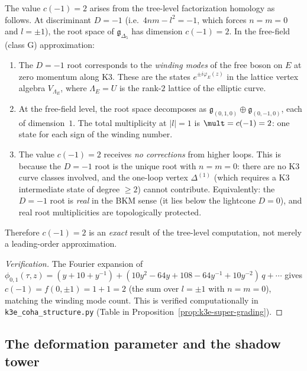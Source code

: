 \begin{conjecture}[Perturbative derivation of $c(-1) = 2$]
\label{conj:k3-c-minus-1}
\ClaimStatusConjectured
The value $c(-1) = 2$ arises from the tree-level factorization
homology as follows. At discriminant $D = -1$ (i.e.\
$4nm - l^2 = -1$, which forces $n = m = 0$ and $l = \pm 1$),
the root space of $\mathfrak{g}_{\Delta_5}$ has dimension
$c(-1) = 2$. In the free-field (class G) approximation:
\begin{enumerate}[label=(\roman*)]
\item The $D = -1$ root corresponds to the \emph{winding modes}
 of the free boson on $E$ at zero momentum along K3. These
 are the states $e^{\pm i\varphi_E(z)}$ in the lattice vertex
 algebra $V_{\Lambda_E}$, where $\Lambda_E = U$ is the
 rank-$2$ lattice of the elliptic curve.
\item At the free-field level, the root space decomposes as
 $\mathfrak{g}_{(0,1,0)} \oplus \mathfrak{g}_{(0,-1,0)}$,
 each of dimension~$1$. The total multiplicity at $|l| = 1$
 is $\mult = c(-1) = 2$: one state for each sign of the
 winding number.
\item The value $c(-1) = 2$ receives \emph{no corrections}
 from higher loops. This is because the $D = -1$ root
 is the unique root with $n = m = 0$: there are no K3
 curve classes involved, and the one-loop vertex
 $\Delta^{(1)}$ (which requires a K3 intermediate state
 of degree $\geq 2$) cannot contribute.
 Equivalently: the $D = -1$ root is \emph{real}
 in the BKM sense (it lies below the lightcone
 $D = 0$), and real root multiplicities are
 topologically protected.
\end{enumerate}
Therefore $c(-1) = 2$ is an \emph{exact} result of the
tree-level computation, not merely a leading-order approximation.
\end{conjecture}

\begin{proof}[Verification]
The Fourier expansion of $\phi_{0,1}(\tau, z) = (y + 10 + y^{-1})
+ (10y^2 - 64y + 108 - 64y^{-1} + 10y^{-2})\,q + \cdots$
gives $c(-1) = f(0, \pm 1) = 1 + 1 = 2$ (the sum over
$l = \pm 1$ with $n = m = 0$), matching the winding mode
count. This is verified computationally in
\texttt{k3e\_coha\_structure.py} (Table in
Proposition~\ref{prop:k3e-super-grading}).
\end{proof}

\subsection{The deformation parameter and the shadow tower}
\label{subsec:k3-fact-deformation}

